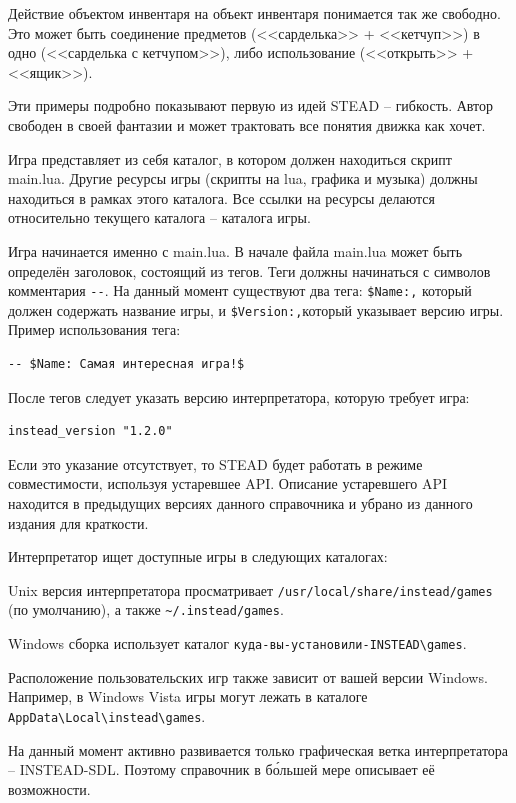 \documentclass[a4paper,12pt]{article}
\begin{document}
Действие объектом инвентаря на объект инвентаря понимается так же свободно. Это может быть соединение предметов (<<сарделька>> + <<кетчуп>>) в одно (<<сарделька с кетчупом>>), либо использование (<<открыть>> + <<ящик>>).

Эти примеры подробно показывают первую из идей STEAD -- гибкость. Автор свободен в своей фантазии и может трактовать все понятия движка как хочет.

Игра представляет из себя каталог, в котором должен находиться скрипт main.lua. Другие ресурсы игры (скрипты на lua, графика и музыка) должны находиться в рамках этого каталога. Все ссылки на ресурсы делаются относительно текущего каталога -- каталога игры.

Игра начинается именно с main.lua. В начале файла main.lua может быть определён заголовок, состоящий из тегов. Теги должны начинаться с символов комментария \verb/--/. На данный момент существуют два тега: \verb/$Name:,/ который должен содержать название игры, и \verb/$Version:,/который указывает версию игры. Пример использования тега:

\begin{verbatim}
-- $Name: Самая интересная игра!$
\end{verbatim}

После тегов следует указать версию интерпретатора, которую требует игра:

\begin{verbatim}
instead_version "1.2.0"
\end{verbatim}

Если это указание отсутствует, то STEAD будет работать в режиме совместимости, используя устаревшее API. Описание устаревшего API находится в предыдущих версиях данного справочника и убрано из данного издания для краткости.

Интерпретатор ищет доступные игры в следующих каталогах:

Unix версия интерпретатора просматривает \verb;/usr/local/share/instead/games; (по умолчанию), а также \verb,~/.instead/games,.

Windows сборка использует каталог \verb/куда-вы-установили-INSTEAD\games/.

Расположение пользовательских игр также зависит от вашей версии Windows. Например, в Windows Vista игры могут лежать в каталоге \verb/AppData\Local\instead\games/.

На данный момент активно развивается только графическая ветка интерпретатора -- INSTEAD-SDL. Поэтому справочник в б\'{о}льшей мере описывает её возможности.
\end{document}
